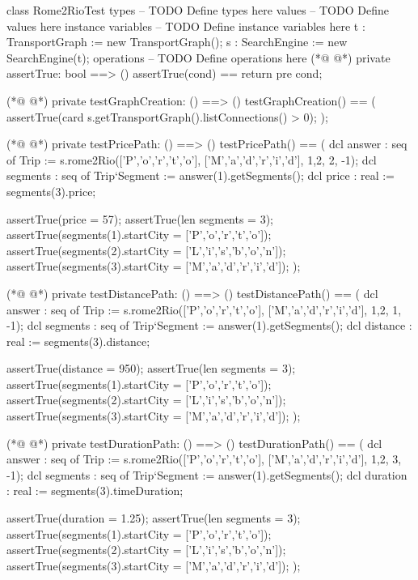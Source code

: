 \begin{vdmpp}[breaklines=true]
class Rome2RioTest
types
-- TODO Define types here
values
-- TODO Define values here
instance variables
-- TODO Define instance variables here
  t : TransportGraph := new TransportGraph();
  s : SearchEngine := new SearchEngine(t);
operations
-- TODO Define operations here
(*@
\label{assertTrue:12}
@*)
   private assertTrue: bool ==> ()
    assertTrue(cond) == return
    pre cond;

(*@
\label{testGraphCreation:16}
@*)
    private testGraphCreation: () ==> ()
    testGraphCreation() == (
      assertTrue(card s.getTransportGraph().listConnections() > 0);
    );
    
(*@
\label{testPricePath:21}
@*)
    private testPricePath: () ==> ()
    testPricePath() == (
      dcl answer : seq of Trip := s.rome2Rio(['P','o','r','t','o'], ['M','a','d','r','i','d'], {1,2}, 2, -1);
      dcl segments : seq of Trip`Segment := answer(1).getSegments();
      dcl price : real := segments(3).price;
     
      assertTrue(price = 57);
      assertTrue(len segments = 3);
      assertTrue(segments(1).startCity = ['P','o','r','t','o']);
      assertTrue(segments(2).startCity = ['L','i','s','b','o','n']);
      assertTrue(segments(3).startCity = ['M','a','d','r','i','d']);
    );
    
(*@
\label{testDistancePath:34}
@*)
    private testDistancePath: () ==> ()
    testDistancePath() == (
      dcl answer : seq of Trip := s.rome2Rio(['P','o','r','t','o'], ['M','a','d','r','i','d'], {1,2}, 1, -1);
      dcl segments : seq of Trip`Segment := answer(1).getSegments();
      dcl distance : real := segments(3).distance;
      
      assertTrue(distance = 950);
      assertTrue(len segments = 3);
      assertTrue(segments(1).startCity = ['P','o','r','t','o']);
      assertTrue(segments(2).startCity = ['L','i','s','b','o','n']);
      assertTrue(segments(3).startCity = ['M','a','d','r','i','d']);
    );
    
(*@
\label{testDurationPath:47}
@*)
    private testDurationPath: () ==> ()
    testDurationPath() == (
      dcl answer : seq of Trip := s.rome2Rio(['P','o','r','t','o'], ['M','a','d','r','i','d'], {1,2}, 3, -1);
      dcl segments : seq of Trip`Segment := answer(1).getSegments();
      dcl duration : real := segments(3).timeDuration;
      
      assertTrue(duration = 1.25);
      assertTrue(len segments = 3);
      assertTrue(segments(1).startCity = ['P','o','r','t','o']);
      assertTrue(segments(2).startCity = ['L','i','s','b','o','n']);
      assertTrue(segments(3).startCity = ['M','a','d','r','i','d']);
    );
    

\end{vdmpp}
